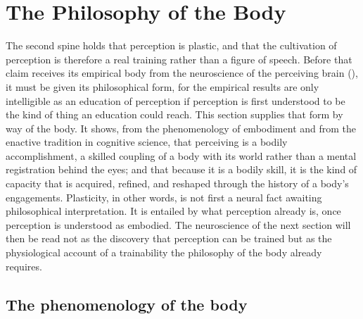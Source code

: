 \section{The Philosophy of the Body}
\label{p23:sec:body}

\noindent
The second spine holds that perception is plastic, and that the cultivation of perception is therefore a real training rather than a figure of speech. Before that claim receives its empirical body from the neuroscience of the perceiving brain (), it must be given its philosophical form, for the empirical results are only intelligible as an education of perception if perception is first understood to be the kind of thing an education could reach. This section supplies that form by way of the body. It shows, from the phenomenology of embodiment and from the enactive tradition in cognitive science, that perceiving is a bodily accomplishment, a skilled coupling of a body with its world rather than a mental registration behind the eyes; and that because it is a bodily skill, it is the kind of capacity that is acquired, refined, and reshaped through the history of a body's engagements. Plasticity, in other words, is not first a neural fact awaiting philosophical interpretation. It is entailed by what perception already is, once perception is understood as embodied. The neuroscience of the next section will then be read not as the discovery that perception can be trained but as the physiological account of a trainability the philosophy of the body already requires.

\subsection{The phenomenology of the body}
\label{p23:sub:body-phenomenology}

